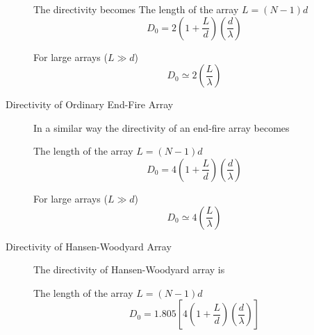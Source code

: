 \documentclass{beamer}
\begin{document}
	\begin{frame}
		\begin{description}
			\item[]The directivity becomes
			The length of the array $ L = (N - 1)d $
			\begin{equation}
			D_0 = 2\left(1+\frac{L}{d}\right)\left(\frac{d}{\lambda}\right)
			\end{equation}
			\item[]For large arrays ($ L\gg d $)
			\begin{equation}
			D_0 \simeq 2\left(\frac{L}{\lambda}\right)
			\end{equation}
		\end{description}
		\color{blue}Directivity of Ordinary End-Fire Array\color{black}
		\begin{description}
			\item[] In a similar way the directivity of an end-fire array
			becomes
		\end{description}
	\end{frame}
	\begin{frame}
		\begin{description}
			\item[] The length of the array $ L = (N - 1)d $
			\begin{equation}
			D_0 = 4\left(1+\frac{L}{d}\right)\left(\frac{d}{\lambda}\right)
			\end{equation}
			\item[]For large arrays ($ L\gg d $)
			\begin{equation}
			D_0 \simeq 4\left(\frac{L}{\lambda}\right)
			\end{equation}
		\end{description}
		\color{blue}Directivity of Hansen-Woodyard Array\color{black}
		\begin{description}
			\item[] The directivity of Hansen-Woodyard array is
			\boxedeq{}{D =  1.805\left[4N\left(\dfrac{d}{\lambda}\right)\right]}
			\item[] The length of the array $ L = (N - 1)d $
			\begin{equation}
			D_0 =1.805\left[ 4\left(1+\frac{L}{d}\right)\left(\frac{d}{\lambda}\right)\right]
			\end{equation}
		\end{description}
	\end{frame}
\end{document}
